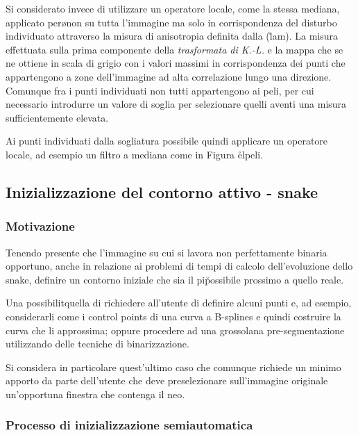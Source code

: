 Si \e considerato invece di utilizzare un operatore locale, come
la stessa mediana, applicato per\o non su tutta l'immagine ma solo in corrispondenza del
disturbo individuato attraverso la misura di anisotropia definita dalla (\r{lam}).
La misura \e effettuata sulla prima componente della {\it trasformata di K.-L.} e la mappa che se
ne ottiene \e in scala di grigio con i valori massimi in corrispondenza
dei punti che appartengono a zone dell'immagine ad alta correlazione lungo una direzione.
Comunque fra i punti individuati non tutti appartengono ai peli, per cui \e necessario
introdurre un valore di soglia per selezionare quelli aventi una misura sufficientemente
elevata.

Ai punti individuati dalla sogliatura \e possibile quindi applicare un operatore locale, 
ad esempio un filtro a mediana come in Figura \r{elpeli}.

\subsection{Inizializzazione del contorno attivo - snake}

\subsubsection{Motivazione}

Tenendo presente che l'immagine su cui si lavora non \e perfettamente binaria \e opportuno,
anche in relazione ai problemi di tempi di calcolo dell'evoluzione dello snake, definire
un contorno iniziale che sia il pi\u possibile prossimo a quello reale. 

Una possibilit\a \e quella di richiedere all'utente di definire alcuni punti e, ad esempio,
considerarli come i control points di una curva a B-splines e quindi costruire la curva 
che li approssima; oppure procedere ad una grossolana pre-segmentazione utilizzando
delle tecniche di binarizzazione.

Si considera in particolare quest'ultimo caso che comunque richiede un minimo apporto da parte
dell'utente che deve preselezionare sull'immagine originale un'opportuna finestra
che contenga il neo.

\subsubsection{Processo di inizializzazione semiautomatica}

